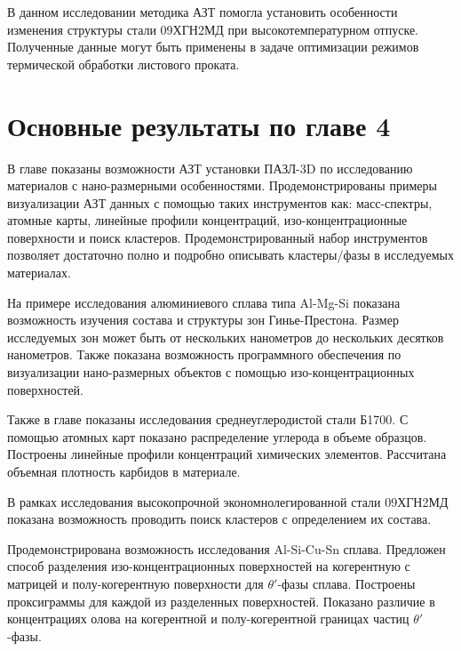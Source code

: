 В данном исследовании методика АЗТ помогла установить особенности изменения структуры стали 09ХГН2МД при высокотемпературном отпуске. Полученные данные могут быть применены в задаче оптимизации режимов термической обработки листового проката.

\FloatBarrier

\clearpage
\section{Основные результаты по главе 4}\label{sec:ch4/sect5}


В главе показаны возможности АЗТ установки ПАЗЛ-3D по исследованию материалов с нано-размерными особенностями. Продемонстрированы примеры визуализации АЗТ данных с помощью таких инструментов как: масс-спектры, атомные карты, линейные профили концентраций, изо-концентрационные поверхности и поиск кластеров. Продемонстрированный набор инструментов позволяет достаточно полно и подробно описывать кластеры/фазы в исследуемых материалах.

На примере исследования алюминиевого сплава типа Al-Mg-Si показана возможность изучения состава и структуры зон Гинье-Престона. Размер исследуемых зон может быть от нескольких нанометров до нескольких десятков нанометров. Также показана возможность программного обеспечения по визуализации нано-размерных объектов с помощью изо-концентрационных поверхностей.

Также в главе показаны исследования среднеуглеродистой стали Б1700. С помощью атомных карт показано распределение углерода в объеме образцов. Построены линейные профили концентраций химических элементов. Рассчитана объемная плотность карбидов в материале.

В рамках исследования высокопрочной экономнолегированной стали 09ХГН2МД показана возможность проводить поиск кластеров с определением их состава.

Продемонстрирована возможность исследования Al-Si-Cu-Sn сплава. Предложен способ разделения изо-концентрационных поверхностей на когерентную с матрицей и полу-когерентную поверхности для $\theta '$-фазы сплава. Построены проксиграммы для каждой из разделенных поверхностей. Показано различие в концентрациях олова на когерентной и полу-когерентной границах частиц $\theta '$-фазы.




\FloatBarrier
\clearpage


















